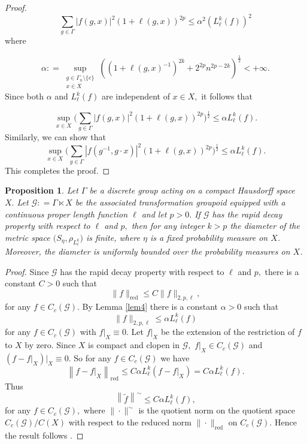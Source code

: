 \documentclass[a4paper,11pt,reqno]{amsart}
\theoremstyle{plain}
\newtheorem{prop}[thm]{Proposition}
\theoremstyle{named}
\numberwithin{equation}{section}
\begin{document}
\begin{proof}
				$$\sum\limits_{g \in \Gamma} \left \lvert f(g, x) \right \rvert^2 \left (1 + \ell (g, x) \right )^{2p} \leq \alpha^2 \left (L_{\ell}^k (f) \right )^2$$
				where 
				
				$$\alpha : = \sup\limits_{\substack {g \in \Gamma_n \setminus \{e\} \\ x \in X}} \left (\left (1 + \ell (g, x)^{-1} \right )^{2k} + 2^{2p} n^{2p - 2k} \right )^{\frac {1} {2}} < + \infty.$$
				Since both $\alpha$ and $L_{\ell}^k (f)$ are independent of $x \in X,$ it follows that
				
				$$\sup\limits_{x \in X} \biggl(\sum\limits_{g \in \Gamma} \left \lvert f(g, x) \right \rvert^2 \left (1 + \ell (g, x) \right )^{2p}\biggr)^{\frac{1}{2}} \leq \alpha L_{\ell}^k (f).$$
				Similarly, we can show that
				$$\sup\limits_{x \in X} \biggl(\sum\limits_{g \in \Gamma} \left \lvert f \left (g^{-1}, g \cdot x \right ) \right \rvert^2 \left (1 + \ell (g, x) \right )^{2p} \biggr)^{\frac{1}{2}}\leq \alpha L_{\ell}^k (f).$$
				This completes the proof.
				\end{proof}
			
			\begin{prop}
				Let $\Gamma$ be a discrete group acting on a compact Hausdorff space $X.$ Let $\mathcal G : = \Gamma \ltimes X$ be the associated transformation groupoid equipped with a continuous proper length function $\ell$ and let $p > 0.$ If $\mathcal G$ has the rapid decay property with respect to $\ell$ and $p,$ then for any integer $k > p$ the diameter of the metric space $\big (S_{\eta}, \rho_{L_{\ell}^k} \big )$ is finite, where $\eta$ is a fixed probability measure on $X$. Moreover, the diameter is uniformly bounded over the probability measures on $X$.    
			\end{prop}
			
			\begin{proof}
				Since $\mathcal G$ has the rapid decay property with respect to $\ell$ and $p,$ there is a constant $C > 0$ such that
				$$\|f\|_{\mathrm {red}} \leq C \|f\|_{2, p, \ell},$$ \vspace{4mm}
				for any $f \in C_c (\mathcal G).$ By Lemma \ref{lem4} there is a constant $\alpha > 0$ such that 
				$$\|f\|_{2,p,\ell} \leq \alpha L_{\ell}^k (f)$$
				for any $f \in C_c (\mathcal G)$ with $f \rvert_{X} \equiv 0.$ Let $f \rvert_{X}$ be the extension of the restriction of $f$ to $X$ by zero. Since $X$ is compact and clopen in $\mathcal G,$ $f \rvert_{X} \in C_c (\mathcal G)$ and $\left (f - f \rvert_{X} \right ) \big\rvert_{X} \equiv 0.$ So for any $f \in C_c (\mathcal G)$ we have
				$$\left \|f - f \rvert_{X} \right \|_{\mathrm {red}} \leq C \alpha L_{\ell}^k \left (f - f \rvert_{X} \right ) = C \alpha L_{\ell}^k (f).$$
				Thus
				\vspace{2mm}
				$$\left \|\tilde f \right \|^{\sim} \leq C \alpha L_{\ell}^k (f),$$
				for any $f \in C_c (\mathcal G),$ where $\|\cdot\|^{\sim}$ is the quotient norm on the quotient space $C_c (\mathcal G)/ C(X)$ with respect to the reduced norm $\|\cdot\|_{\mathrm {red}}$ on $C_c (\mathcal G).$ Hence the result follows \cite[Proposition 2.2]{Rieffel-1999-Metrics-on-state-spaces}.
			\end{proof}
			
\end{document}
